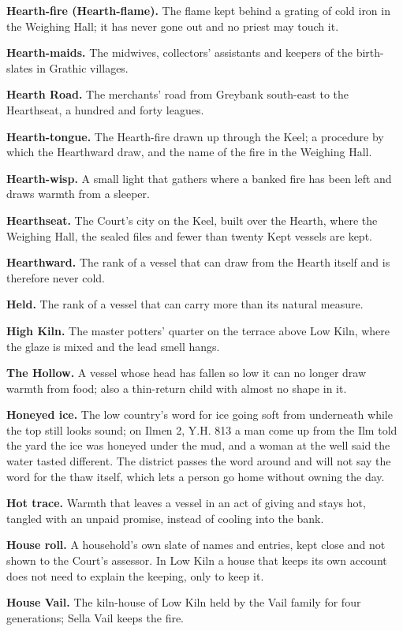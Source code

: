 \documentclass{design/chronicle}
\begin{document}
\textbf{Hearth-fire (Hearth-flame).} The flame kept behind a grating of cold iron in the Weighing Hall; it has never gone out and no priest may touch it.

\textbf{Hearth-maids.} The midwives, collectors’ assistants and keepers of the birth-slates in Grathic villages.

\textbf{Hearth Road.} The merchants’ road from Greybank south-east to the Hearthseat, a hundred and forty leagues.

\textbf{Hearth-tongue.} The Hearth-fire drawn up through the Keel; a procedure by which the Hearthward draw, and the name of the fire in the Weighing Hall.

\textbf{Hearth-wisp.} A small light that gathers where a banked fire has been left and draws warmth from a sleeper.

\textbf{Hearthseat.} The Court’s city on the Keel, built over the Hearth, where the Weighing Hall, the sealed files and fewer than twenty Kept vessels are kept.

\textbf{Hearthward.} The rank of a vessel that can draw from the Hearth itself and is therefore never cold.

\textbf{Held.} The rank of a vessel that can carry more than its natural measure.

\textbf{High Kiln.} The master potters’ quarter on the terrace above Low Kiln, where the glaze is mixed and the lead smell hangs.

\textbf{The Hollow.} A vessel whose head has fallen so low it can no longer draw warmth from food; also a thin-return child with almost no shape in it.

\textbf{Honeyed ice.} The low country’s word for ice going soft from underneath while the top still looks sound; on Ilmen 2, Y.H. 813 a man come up from the Ilm told the yard the ice was honeyed under the mud, and a woman at the well said the water tasted different. The district passes the word around and will not say the word for the thaw itself, which lets a person go home without owning the day.

\textbf{Hot trace.} Warmth that leaves a vessel in an act of giving and stays hot, tangled with an unpaid promise, instead of cooling into the bank.

\textbf{House roll.} A household’s own slate of names and entries, kept close and not shown to the Court’s assessor. In Low Kiln a house that keeps its own account does not need to explain the keeping, only to keep it.

\textbf{House Vail.} The kiln-house of Low Kiln held by the Vail family for four generations; Sella Vail keeps the fire.
\end{document}
